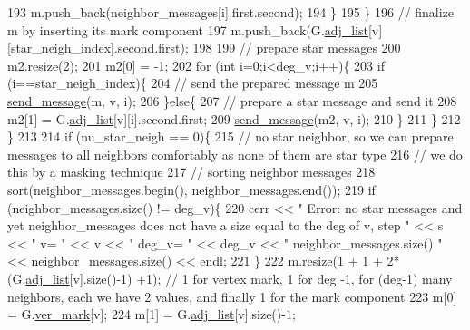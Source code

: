 \begin{DoxyCode}
193                 m.push\_back(neighbor\_messages[i].first.second);
194               \}
195             \}
196             \textcolor{comment}{// finalize m by inserting its mark component}
197             m.push\_back(G.\hyperlink{classmarked__graph_a1a0bf7ca413a278763f7c878b3b6fd6f}{adj\_list}[v][star\_neigh\_index].second.first);
198 
199             \textcolor{comment}{// prepare star messages}
200             m2.resize(2);
201             m2[0] = -1;
202             \textcolor{keywordflow}{for} (\textcolor{keywordtype}{int} i=0;i<deg\_v;i++)\{
203               \textcolor{keywordflow}{if} (i==star\_neigh\_index)\{
204                 \textcolor{comment}{// send the prepared message m}
205                 \hyperlink{classgraph__message_aa76d1d5420a12477fa1dddd878d78c8f}{send\_message}(m, v, i);
206               \}\textcolor{keywordflow}{else}\{
207                 \textcolor{comment}{// prepare a star message and send it}
208                 m2[1] = G.\hyperlink{classmarked__graph_a1a0bf7ca413a278763f7c878b3b6fd6f}{adj\_list}[v][i].second.first;
209                 \hyperlink{classgraph__message_aa76d1d5420a12477fa1dddd878d78c8f}{send\_message}(m2, v, i);
210               \}
211             \}
212           \}
213 
214           \textcolor{keywordflow}{if} (nu\_star\_neigh == 0)\{
215             \textcolor{comment}{// no star neighbor, so we can prepare messages to all neighbors comfortably as none of them
       are star type}
216             \textcolor{comment}{// we do this by a masking technique}
217             \textcolor{comment}{// sorting neighbor messages}
218             sort(neighbor\_messages.begin(), neighbor\_messages.end());
219             \textcolor{keywordflow}{if} (neighbor\_messages.size() != deg\_v)\{
220               cerr << \textcolor{stringliteral}{" Error: no star messages and yet neighbor\_messages does not have a size equal to the
       deg of v, step "} << s << \textcolor{stringliteral}{" v= "} << v <<  \textcolor{stringliteral}{" deg\_v= "} << deg\_v << \textcolor{stringliteral}{" neighbor\_messages.size() "} << 
      neighbor\_messages.size() << endl;
221             \}
222             m.resize(1 + 1 + 2*(G.\hyperlink{classmarked__graph_a1a0bf7ca413a278763f7c878b3b6fd6f}{adj\_list}[v].size()-1) +1); \textcolor{comment}{// 1 for vertex mark, 1 for deg -1,
       for (deg-1) many neighbors, each we have 2 values, and finally 1 for the mark component}
223             m[0] = G.\hyperlink{classmarked__graph_ac83e9377dd4d8bb95be1ac949b127296}{ver\_mark}[v];
224             m[1] = G.\hyperlink{classmarked__graph_a1a0bf7ca413a278763f7c878b3b6fd6f}{adj\_list}[v].size()-1;

\end{DoxyCode}
